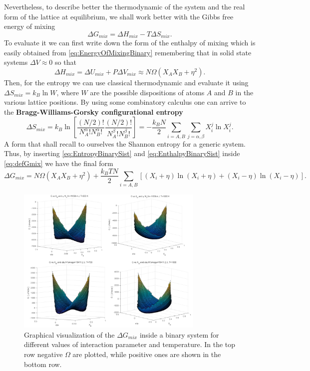 Nevertheless, to describe better the thermodynamic of the system and the real form of the lattice at equilibrium, we shall work better with the Gibbs free energy of mixing
\begin{equation}
    \label{eq:defGmix}
    \Delta G_{mix} = \Delta H_{mix} - T\Delta S_{mix}.
\end{equation}
To evaluate it we can first write down the form of the enthalpy of mixing which is easily obtained from \eqref{eq:EnergyOfMixingBinary} remembering that in solid state systems $\Delta V \approx 0$ so that
\begin{equation}
    \label{eq:EnthalpyBinarySist}
    \Delta H_{mix} = \Delta U_{mix} + P\Delta V_{mix} \approx N\Omega\left( X_AX_B + \eta^2 \right).
\end{equation}
Then, for the entropy we can use classical thermodynamic and evaluate it using $\Delta S_{mix} = k_B\ln W$, where $W$ are the possible dispositions of atoms $A$ and $B$ in the various lattice positions. By using some combinatory calculus one can arrive to the \textbf{Bragg-Williams-Gorsky configurational entropy}
\begin{equation}
    \label{eq:EntropyBinarySist}
    \Delta S_{mix} = k_B\ln\left[ \frac{(N/2)!}{N_A^\alpha !N_B^\alpha !}\frac{(N/2)!}{N_A^\beta !N_B^\beta !} \right] = -\frac{k_B N}{2}\sum_{i = A,B}\sum_{j=\alpha, \beta} X_i^j \ln X_i^j.
\end{equation}
A form that shall recall to ourselves the Shannon entropy for a generic system. Thus, by inserting \eqref{eq:EntropyBinarySist} and \eqref{eq:EnthalpyBinarySist} inside \eqref{eq:defGmix} we have the final form
\begin{equation}
    \label{eq:GibssMixingBinary}
    \Delta G_{mix} = N\Omega\left( X_AX_B + \eta^2 \right) + \frac{k_BTN}{2}\sum_{i = A,B} \left[(X_i + \eta) \ln\left( X_i + \eta \right) + (X_i - \eta) \ln\left( X_i - \eta \right)\right].
\end{equation}
\begin{figure}[t]
    \centering
    \includegraphics[width=0.8\textwidth]{Immagini/SimulazioniBinary.png}
    \caption
    {
        Graphical visualization of the $\Delta G_{mix}$ inside a binary system for different values of interaction parameter and temperature. In the top row negative $\Omega$ are plotted, while positive ones are shown in the bottom row.
    }
    \label{fig:SimulazioniBinary}
\end{figure}

